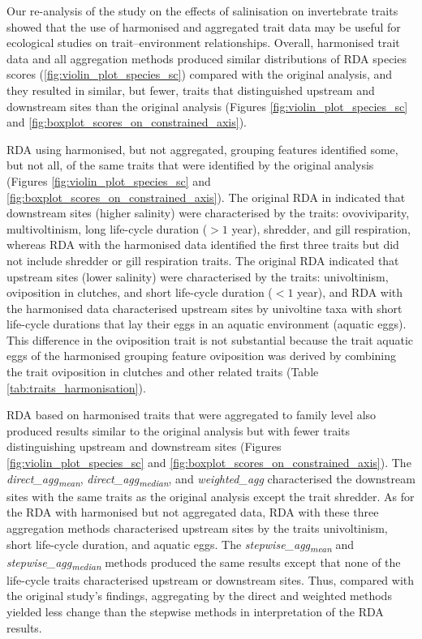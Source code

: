 \documentclass[12pt]{article}
\begin{document}
Our re-analysis of the \citet{szocs_effects_2014} study on the effects of salinisation on invertebrate traits showed that the use of harmonised and aggregated trait data may be useful for ecological studies on trait–environment relationships. Overall, harmonised trait data and all aggregation methods produced similar distributions of RDA species scores (\ref{fig:violin_plot_species_sc}) compared with the original analysis, and they resulted in similar, but fewer, traits that distinguished upstream and downstream sites than the original analysis (Figures \ref{fig:violin_plot_species_sc} and \ref{fig:boxplot_scores_on_constrained_axis}).

RDA using harmonised, but not aggregated, grouping features identified some, but not all, of the same traits that were identified by the original analysis (Figures \ref{fig:violin_plot_species_sc} and \ref{fig:boxplot_scores_on_constrained_axis}). The original RDA in \citet{szocs_effects_2014} indicated that downstream sites (higher salinity) were characterised by the traits: ovoviviparity, multivoltinism, long life-cycle duration ($> 1$ year), shredder, and gill respiration, whereas RDA with the harmonised data identified the first three traits but did not include shredder or gill respiration traits. The original RDA indicated that upstream sites (lower salinity) were characterised by the traits: univoltinism, oviposition in clutches, and short life-cycle duration ($< 1$ year), and RDA with the harmonised data characterised upstream sites by univoltine taxa with short life-cycle durations that lay their eggs in an aquatic environment (aquatic eggs). This difference in the oviposition trait is not substantial because the trait aquatic eggs of the harmonised grouping feature oviposition was derived by combining the trait oviposition in clutches and other related traits (Table \ref{tab:traits_harmonisation}).

RDA based on harmonised traits that were aggregated to family level also produced results similar to the original analysis but with fewer traits distinguishing upstream and downstream sites (Figures \ref{fig:violin_plot_species_sc} and \ref{fig:boxplot_scores_on_constrained_axis}). The \textit{direct\_agg\textsubscript{mean}}, \textit{direct\_agg\textsubscript{median}}, and \textit{weighted\_agg} characterised the downstream sites with the same traits as the original analysis except the trait shredder. As for the RDA with harmonised but not aggregated data, RDA with these three aggregation methods characterised upstream sites by the traits univoltinism, short life-cycle duration, and aquatic eggs. The \textit{stepwise\_agg\textsubscript{mean}} and \textit{stepwise\_agg\textsubscript{median}} methods produced the same results except that none of the life-cycle traits characterised upstream or downstream sites. Thus, compared with the original study’s findings, aggregating by the direct and weighted methods yielded less change than the stepwise methods in interpretation of the RDA results.
\end{document}
